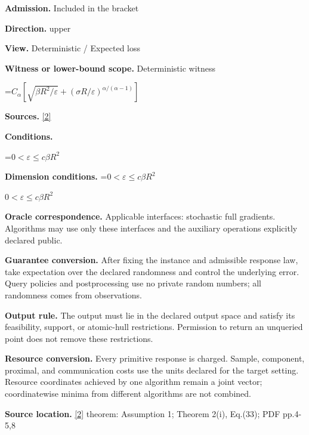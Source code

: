 \documentclass[10pt,a4paper]{article}
\newcommand{\AtlasMath}[1]{\par\begingroup\centering\setbox0=\hbox{$\displaystyle #1$}\ifdim\wd0>1.4\linewidth\typeout{ATLAS WIDE FORMULA: \the\wd0}\fi\ifdim\wd0>\linewidth\resizebox{\linewidth}{!}{\box0}\else\box0\fi\par\endgroup}
\newcommand{\AtlasInlineMath}[1]{\begingroup\setbox0=\hbox{$#1$}\ifdim\wd0>.4\linewidth\endgroup\AtlasMath{#1}\else\endgroup$#1$\fi}
\begin{document}
\textbf{Admission.} Included in the bracket



\textbf{Direction.} upper



\textbf{View.} Deterministic / Expected loss



\textbf{Witness or lower-bound scope.} Deterministic witness



\AtlasMath{C_\alpha[\sqrt{\beta R^2/\varepsilon}+(\sigma R/\varepsilon)^{\alpha/(\alpha-1)}]}


\textbf{Sources.} \href{https://arxiv.org/pdf/2510.11676}{[2]}



\textbf{Conditions.}
\AtlasMath{0<\varepsilon\le c\beta R^2}




\textbf{Dimension conditions.} \AtlasInlineMath{0<\varepsilon\le c\beta R^2}



\textbf{Oracle correspondence.} Applicable interfaces: stochastic full gradients. Algorithms may use only these interfaces and the auxiliary operations explicitly declared public.



\textbf{Guarantee conversion.} After fixing the instance and admissible response law, take expectation over the declared randomness and control the underlying error. Query policies and postprocessing use no private random numbers; all randomness comes from observations.



\textbf{Output rule.} The output must lie in the declared output space and satisfy its feasibility, support, or atomic-hull restrictions. Permission to return an unqueried point does not remove these restrictions.



\textbf{Resource conversion.} Every primitive response is charged. Sample, component, proximal, and communication costs use the units declared for the target setting. Resource coordinates achieved by one algorithm remain a joint vector; coordinatewise minima from different algorithms are not combined.



\textbf{Source location.} \href{https://arxiv.org/pdf/2510.11676}{[2]} theorem: Assumption 1; Theorem 2(i), Eq.(33); PDF pp.4-5,8
\end{document}
